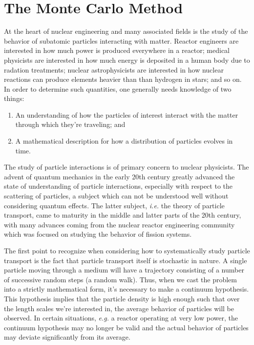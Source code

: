 \section{The Monte Carlo Method}

At the heart of nuclear engineering and many associated fields is the
study of the behavior of subatomic particles interacting with
matter. Reactor engineers are interested in how much power is produced
everywhere in a reactor; medical physicists are interested in how much
energy is deposited in a human body due to radation treatments;
nuclear astrophysicists are interested in how nuclear reactions can
produce elements heavier than than hydrogen in stars; and so on. In
order to determine such quantities, one generally needs knowledge of
two things:
\begin{enumerate}
  \item An understanding of how the particles of interest interact
    with the matter through which they're traveling; and
  \item A mathematical description for how a distribution of particles
    evolves in time.
\end{enumerate}
The study of particle interactions is of primary concern to nuclear
physicists. The advent of quantum mechanics in the early 20th century
greatly advanced the state of understanding of particle interactions,
especially with respect to the scattering of particles, a subject
which can not be understood well without considering quantum
effects. The latter subject, {\em i.e.} the theory of particle
transport, came to maturity in the middle and latter parts of the 20th
century, with many advances coming from the nuclear reactor
engineering community which was focused on studying the behavior of
fission systems.

The first point to recognize when considering how to systematically
study particle transport is the fact that particle transport itself is
stochastic in nature. A single particle moving through a medium will
have a trajectory consisting of a number of successive random steps (a
random walk). Thus, when we cast the problem into a strictly
mathematical form, it's necessary to make a continuum hypothesis. This
hypothesis implies that the particle density is high enough such that
over the length scales we're interested in, the average behavior of
particles will be observed. In certain situations, {\em e.g.} a
reactor operating at very low power, the continuum hypothesis may no
longer be valid and the actual behavior of particles may deviate
significantly from its average.

